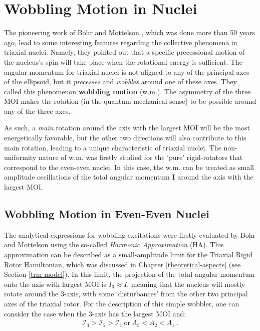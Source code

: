 \chapter{Wobbling Motion in Nuclei}
\label{chapter-3} %

The pioneering work of Bohr and Mottelson \cite{bohr1998nuclear}, which was done more than 50 years ago, lead to some interesting features regarding the collective phenomena in triaxial nuclei. Namely, they pointed out that a specific precessional motion of the nucleus's spin will take place when the rotational energy is sufficient. The angular momentum for triaxial nuclei is not aligned to any of the principal axes of the ellipsoid, but it \emph{precesses} and \emph{wobbles} around one of these axes. They called this phenomenon \textbf{wobbling motion} (w.m.). The asymmetry of the three MOI makes the rotation (in the quantum mechanical sense) to be possible around any of the three axes.

As such, a \emph{main} rotation around the axis with the largest MOI will be the most energetically favorable, but the other two directions will also contribute to this main rotation, leading to a unique characteristic of triaxial nuclei. The non-uniformity nature of w.m. was firstly studied for the `pure' rigid-rotators that correspond to the even-even nuclei. In this case, the w.m. can be treated as small amplitude oscillations of the total angular momentum $\mathbf{I}$ around the axis with the largest MOI.

\section{Wobbling Motion in Even-Even Nuclei}

The analytical expressions for wobbling excitations were firstly evaluated by Bohr and Mottelson using the so-called \emph{Harmonic Approximation} (HA). This approximation can be described as a small-amplitude limit for the Triaxial Rigid Rotor Hamiltonian, which was discussed in Chapter \ref{theoretical-aspects} (see Section \ref{trm-model}). In this limit, the projection of the total angular momentum onto the axis with largest MOI is $I_3\approx I$, meaning that the nucleus will mostly rotate around the $3$-axis, with some `disturbances' from the other two principal axes of the triaxial rotor. For the description of this simple wobbler, one can consider the case when the $3$-axis has the largest MOI and:
\begin{align}
    \mathcal{I}_3>\mathcal{I}_2>\mathcal{I}_1\ \text{or}\ A_3<A_2<A_1\ .
\end{align}

